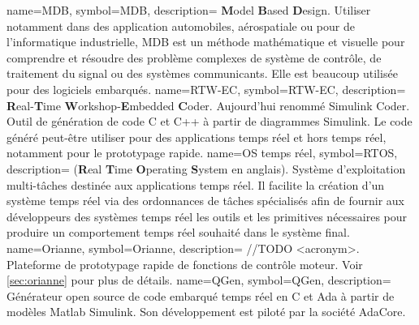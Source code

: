   {
	name=MDB,
	symbol=MDB,
	description=
	{
	  {\bf M}odel {\bf B}ased {\bf D}esign. Utiliser notamment dans des application
	  automobiles, aérospatiale ou pour de l'informatique industrielle, MDB est un
	  méthode mathématique et visuelle pour comprendre et résoudre des problème
	   complexes de système de contrôle, de traitement du signal ou des systèmes
	   communicants. Elle est beaucoup utilisée pour des logiciels embarqués.
	}
}
  {
	name=RTW-EC\up{\circledR},
	symbol=RTW-EC\up{\circledR},
	description=
	{
	  {\bf R}eal-{\bf T}ime {\bf W}orkshop-{\bf E}mbedded {\bf C}oder\up{\circledR}.
	  Aujourd'hui renommé Simulink Coder\up{\texttrademark}. Outil de génération de code
	  C et C++ à partir de diagrammes Simulink\up{\circledR}. Le code généré peut-être
	  utiliser pour des applications temps réel et hors temps réel, notamment pour le
	  prototypage rapide.
	}
}
  {
	name=OS temps réel,
	symbol=RTOS,
	description=
	{
	  ({\bf R}eal {\bf T}ime {\bf O}perating {\bf S}ystem en anglais). Système d'exploitation
	  multi-tâches destinée aux applications temps réel. Il facilite la création d'un système
	  temps réel via des ordonnances de tâches spécialisés afin de fournir aux développeurs
	  des systèmes temps réel les outils et les primitives nécessaires pour produire un
	  comportement temps réel souhaité dans le système final.
	}
}
  {
	name=Orianne,
	symbol=Orianne,
	description=
	{
	  //TODO <acronym>. Plateforme de prototypage rapide de fonctions de contrôle moteur. Voir \ref{sec:orianne} pour plus de détails.
	}
}
  {
	name=QGen,
	symbol=QGen,
	description=
	{
	  Générateur open source de code embarqué temps réel en C et Ada à partir de modèles
	  Matlab\up{\textregistered} Simulink\up{\textregistered}. Son développement est piloté par
	  la société AdaCore.
	}
}
